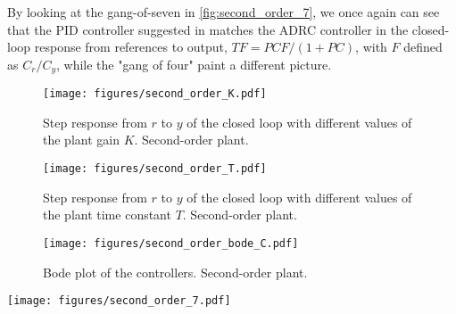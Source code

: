 \documentclass[letterpaper, 10 pt, conference]{ieeeconf}
\begin{document}
By looking at the gang-of-seven in \cref{fig:second_order_7}, we once again can see that the PID controller suggested in \cite{herbst2013simulative} matches the ADRC controller in the closed-loop response from references to output, $TF = PCF/(1 + PC)$, with $F$ defined as $C_r/C_y$,  while the "gang of four" paint a different picture.

\begin{figure}[h]
	\centering
	\texttt{[image: figures/second\_order\_K.pdf]}
	\caption{Step response from $r$ to $y$ of the closed loop with different values of the plant gain $K$. Second-order plant.}
	\label{fig:second_order_K}
\end{figure}
\begin{figure}[h]
	\centering
	\texttt{[image: figures/second\_order\_T.pdf]}
	\caption{Step response from $r$ to $y$ of the closed loop with different values of the plant time constant $T$. Second-order plant.}
	\label{fig:second_order_T}
\end{figure}
\begin{figure}[h]
	\centering
	\texttt{[image: figures/second\_order\_bode\_C.pdf]}
	\caption{Bode plot of the controllers. Second-order plant.}
	\label{fig:second_order_bode_C}
\end{figure}
\begin{figure*}[h]
	\centering
	\texttt{[image: figures/second\_order\_7.pdf]}
	\caption{Gang-of-seven plot for the second-order system. The ADRC controller is shown in blue, the PID controller suggested in \cite{herbst2013simulative} is shown in orange, and the equivalent PIDF controller proposed in this paper is shown in green. The ADRC and the equivalent PIDF controller are identical in most transfer functions (solid lines) and are hard to distinguish in the plots. See the legend of \cref{fig:first_order_7} for more details.}
	\label{fig:second_order_7}
\end{figure*}
\end{document}
